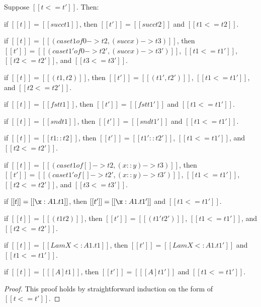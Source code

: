 \begin{lemma}
  \label{lemma:inversion_of_term_precision}
  Suppose $[[t <= t']]$. Then:
  \begin{enumR}
  \item if $[[t]] = [[succ t1]]$, then $[[t']] = [[succ t2]]$ and $[[t1 <= t2]]$.
  \item if $[[t]] = [[(case t1 of 0 -> t2, (succ x) -> t3)]]$, then
    $[[t']] = [[(case t1' of 0 -> t2', (succ x) -> t3')]]$, $[[t1 <= t1']]$, $[[t2 <= t2']]$, and $[[t3 <= t3']]$.
  \item if $[[t]] = [[(t1,t2)]]$, then $[[t']] = [[(t1',t2')]]$, $[[t1 <= t1']]$, and $[[t2 <= t2']]$.
  \item if $[[t]] = [[fst t1]]$, then $[[t']] = [[fst t1']]$ and $[[t1 <= t1']]$.
  \item if $[[t]] = [[snd t1]]$, then $[[t']] = [[snd t1']]$ and $[[t1 <= t1']]$.
  \item if $[[t]] = [[t1::t2]]$, then $[[t']] = [[t1'::t2']]$, $[[t1 <= t1']]$, and $[[t2 <= t2']]$.
  \item if $[[t]] = [[(case t1 of [] -> t2, (x::y) -> t3)]]$, then
    $[[t']] = [[(case t1' of [] -> t2', (x::y) -> t3')]]$, $[[t1 <= t1']]$, $[[t2 <= t2']]$, and $[[t3 <= t3']]$.
  \item if $[[t]] = [[\x:A1.t1]]$, then $[[t']] = [[\x:A1.t1']]$ and $[[t1 <= t1']]$.
  \item if $[[t]] = [[(t1 t2)]]$, then $[[t']] = [[(t1' t2')]]$, $[[t1 <= t1']]$, and $[[t2 <= t2']]$.
  \item if $[[t]] = [[Lam X <: A1.t1]]$, then $[[t']] = [[Lam X <: A1.t1']]$ and $[[t1 <= t1']]$.
  \item if $[[t]] = [[ [A]t1]]$, then $[[t']] = [[ [A]t1']]$ and $[[t1 <= t1']]$.
  \end{enumR}
\end{lemma}
\begin{proof}
  This proof holds by straightforward induction on the form of $[[t <= t']]$.
\end{proof}

